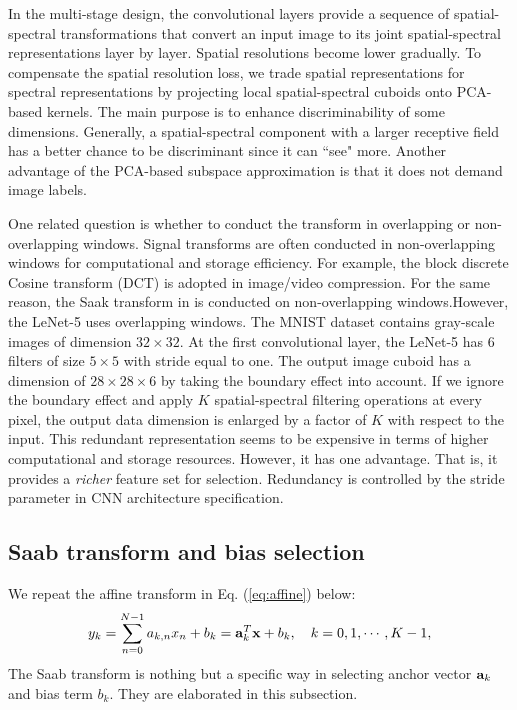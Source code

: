 \documentclass[preprint,12pt]{elsarticle}
\begin{document}
In the multi-stage design, the convolutional layers provide a sequence
of spatial-spectral transformations that convert an input image to its
joint spatial-spectral representations layer by layer. Spatial
resolutions become lower gradually. To compensate the spatial resolution
loss, we trade spatial representations for spectral representations by
projecting local spatial-spectral cuboids onto PCA-based kernels.  The
main purpose is to enhance discriminability of some dimensions.
Generally, a spatial-spectral component with a larger receptive field
has a better chance to be discriminant since it can ``see" more. Another
advantage of the PCA-based subspace approximation is that it does not
demand image labels. 

One related question is whether to conduct the transform in overlapping or non-overlapping windows. Signal transforms are often 
conducted in non-overlapping windows for computational and storage 
efficiency. For example, the block discrete Cosine transform (DCT) is 
adopted in image/video compression.  For the same reason, the Saak 
transform in \cite{kuo2018data} is conducted on non-overlapping 
windows.However, the LeNet-5 uses overlapping windows. The MNIST dataset
contains gray-scale images of dimension $32 \times 32$.  At the first
convolutional layer, the LeNet-5 has 6 filters of size $5\times 5$ with
stride equal to one. The output image cuboid has a dimension of $28
\times 28 \times 6$ by taking the boundary effect into account.  If we
ignore the boundary effect and apply $K$ spatial-spectral filtering
operations at every pixel, the output data dimension is enlarged by a
factor of $K$ with respect to the input.  This redundant representation
seems to be expensive in terms of higher computational and storage
resources.  However, it has one advantage. That is, it provides a {\em
richer} feature set for selection. Redundancy is controlled by the
stride parameter in CNN architecture specification. 


\subsection{Saab transform and bias selection}\label{subsec:bias}

We repeat the affine transform in Eq. (\ref{eq:affine}) below:
\begin{equation}\label{eq:affine_r}
y_k = \sum_{n=0}^{N-1} a_{k,n} x_n + b_k = {\bf a}_k^T {\bf x} 
+ b_k, \quad k=0, 1, \cdots, K-1,
\end{equation}
The Saab transform is nothing but a specific way in selecting anchor
vector ${\bf a}_k$ and bias term $b_k$. They are elaborated in this
subsection. 
\end{document}
